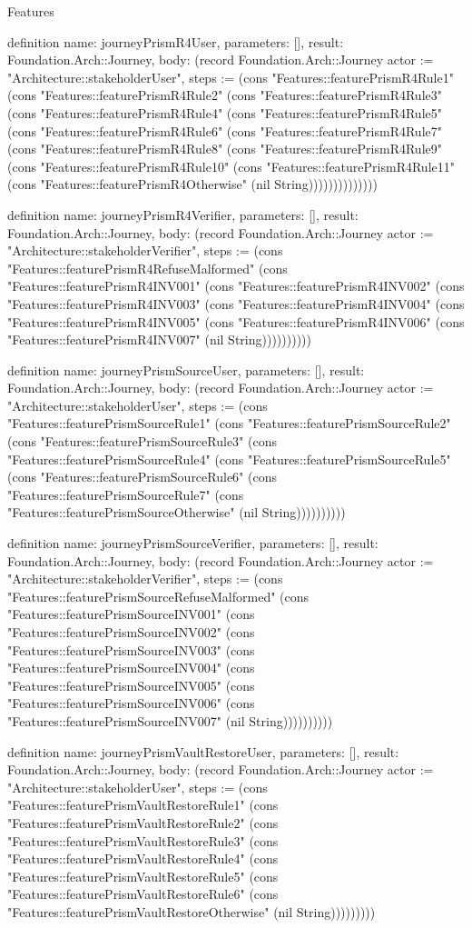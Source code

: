 \begin{lexlean}{Features}
\begin{semanticmodule}
definition{
  name: journeyPrismR4User,
  parameters: [],
  result: Foundation.Arch::Journey,
  body: (record Foundation.Arch::Journey {actor := "Architecture::stakeholderUser", steps := (cons "Features::featurePrismR4Rule1" (cons "Features::featurePrismR4Rule2" (cons "Features::featurePrismR4Rule3" (cons "Features::featurePrismR4Rule4" (cons "Features::featurePrismR4Rule5" (cons "Features::featurePrismR4Rule6" (cons "Features::featurePrismR4Rule7" (cons "Features::featurePrismR4Rule8" (cons "Features::featurePrismR4Rule9" (cons "Features::featurePrismR4Rule10" (cons "Features::featurePrismR4Rule11" (cons "Features::featurePrismR4Otherwise" (nil String)))))))))))))})
}

definition{
  name: journeyPrismR4Verifier,
  parameters: [],
  result: Foundation.Arch::Journey,
  body: (record Foundation.Arch::Journey {actor := "Architecture::stakeholderVerifier", steps := (cons "Features::featurePrismR4RefuseMalformed" (cons "Features::featurePrismR4INV001" (cons "Features::featurePrismR4INV002" (cons "Features::featurePrismR4INV003" (cons "Features::featurePrismR4INV004" (cons "Features::featurePrismR4INV005" (cons "Features::featurePrismR4INV006" (cons "Features::featurePrismR4INV007" (nil String)))))))))})
}

definition{
  name: journeyPrismSourceUser,
  parameters: [],
  result: Foundation.Arch::Journey,
  body: (record Foundation.Arch::Journey {actor := "Architecture::stakeholderUser", steps := (cons "Features::featurePrismSourceRule1" (cons "Features::featurePrismSourceRule2" (cons "Features::featurePrismSourceRule3" (cons "Features::featurePrismSourceRule4" (cons "Features::featurePrismSourceRule5" (cons "Features::featurePrismSourceRule6" (cons "Features::featurePrismSourceRule7" (cons "Features::featurePrismSourceOtherwise" (nil String)))))))))})
}

definition{
  name: journeyPrismSourceVerifier,
  parameters: [],
  result: Foundation.Arch::Journey,
  body: (record Foundation.Arch::Journey {actor := "Architecture::stakeholderVerifier", steps := (cons "Features::featurePrismSourceRefuseMalformed" (cons "Features::featurePrismSourceINV001" (cons "Features::featurePrismSourceINV002" (cons "Features::featurePrismSourceINV003" (cons "Features::featurePrismSourceINV004" (cons "Features::featurePrismSourceINV005" (cons "Features::featurePrismSourceINV006" (cons "Features::featurePrismSourceINV007" (nil String)))))))))})
}

definition{
  name: journeyPrismVaultRestoreUser,
  parameters: [],
  result: Foundation.Arch::Journey,
  body: (record Foundation.Arch::Journey {actor := "Architecture::stakeholderUser", steps := (cons "Features::featurePrismVaultRestoreRule1" (cons "Features::featurePrismVaultRestoreRule2" (cons "Features::featurePrismVaultRestoreRule3" (cons "Features::featurePrismVaultRestoreRule4" (cons "Features::featurePrismVaultRestoreRule5" (cons "Features::featurePrismVaultRestoreRule6" (cons "Features::featurePrismVaultRestoreOtherwise" (nil String))))))))})
}


\end{semanticmodule}
\end{lexlean}
